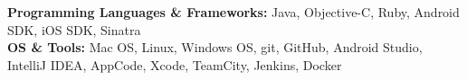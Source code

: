 

\begin{cvparagraph}

\textbf{Programming Languages \& Frameworks:} Java, Objective-C, Ruby, Android SDK, iOS SDK, Sinatra
\\
\textbf{OS \& Tools:} Mac OS, Linux, Windows OS, git, GitHub, Android Studio, IntelliJ IDEA, AppCode, Xcode, TeamCity, Jenkins, Docker

\end{cvparagraph}